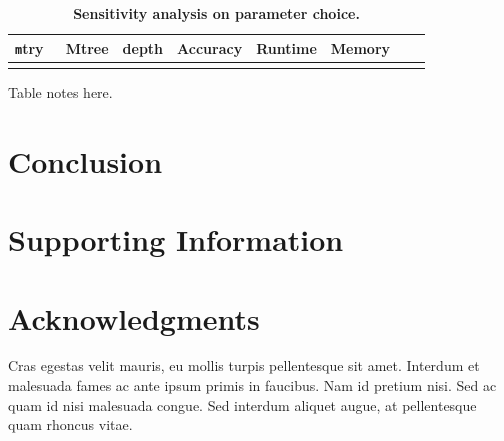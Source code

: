 \documentclass[10pt,letterpaper]{article}
\newcommand{\mtry}{{\texttt mtry}}
\begin{document}
\begin{table}[!ht]
\caption{
{\bf Sensitivity analysis on parameter choice.}}
\begin{tabular}{|l|l|l|l|l|l|l|l|}
\hline
\bf{ \mtry\ }  & \bf{Mtree} & \bf{depth} & \bf{Accuracy} & \bf{Runtime} & \bf{Memory} \\
\hline
&&&&&\\ \hline
\end{tabular}
\begin{flushleft} 
  Table notes here.
\end{flushleft}
\label{table2}
\end{table}




\section{Conclusion}




\section{Supporting Information}



\section*{Acknowledgments}
Cras egestas velit mauris, eu mollis turpis pellentesque sit amet. Interdum et malesuada fames ac ante ipsum primis in faucibus. Nam id pretium nisi. Sed ac quam id nisi malesuada congue. Sed interdum aliquet augue, at pellentesque quam rhoncus vitae.

\nolinenumbers


\end{document}
